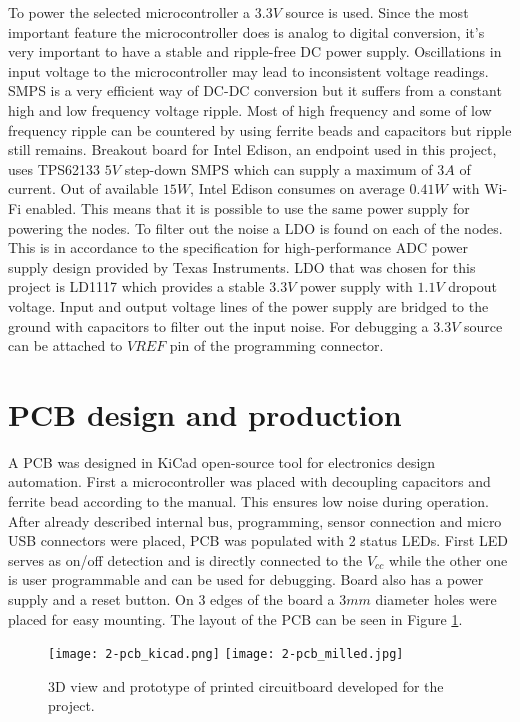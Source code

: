 To power the selected microcontroller a $3.3V$ source is used. Since the most important feature the microcontroller does is analog to digital conversion, it's very important to have a stable and ripple-free \ac{DC} power supply. Oscillations in input voltage to the microcontroller may lead to inconsistent voltage readings. \ac{SMPS} is a very efficient way of \ac{DC}-\ac{DC} conversion but it suffers from a constant high and low frequency voltage ripple. Most of high frequency and some of low frequency ripple can be countered by using ferrite beads and capacitors but ripple still remains. Breakout board for Intel Edison, an endpoint used in this project, uses TPS62133 $5V$ step-down \ac{SMPS} which can supply a maximum of $3A$ of current\cite{edison_breakout}\cite{TPS6213}. Out of available $15W$, Intel Edison consumes on average $0.41W$ with Wi-Fi enabled. This means that it is possible to use the same power supply for powering the nodes. To filter out the noise a \ac{LDO} is found on each of the nodes. This is in accordance to the specification for high-performance \ac{ADC} power supply design provided by Texas Instruments\cite{SMPS}. \ac{LDO} that was chosen for this project is LD1117 which provides a stable $3.3V$ power supply with $1.1V$ dropout voltage. Input and output voltage lines of the power supply are bridged to the ground with capacitors to filter out the input noise. For debugging a $3.3V$ source can be attached to ${VREF}$ pin of the programming connector.


\section{PCB design and production}

A \ac{PCB} was designed in KiCad open-source tool for electronics design automation. First a microcontroller was placed with decoupling capacitors and ferrite bead according to the manual\cite{ATSAMD}. This ensures low noise during operation. After already described internal bus, programming, sensor connection and  micro USB connectors were placed, \ac{PCB} was populated with 2 status \ac{LED}s. First \ac{LED} serves as on/off detection and is directly connected to the $V_{cc}$ while the other one is user programmable and can be used for debugging. Board also has a power supply and a reset button. On 3 edges of the board a $3mm$ diameter holes were placed for easy mounting. The layout of the \ac{PCB} can be seen in Figure \ref{fig:pcb_kicad}.

\begin{figure}[h]
  \begin{center}
    \texttt{[image: 2-pcb\_kicad.png]}
    \hspace{1cm}
    \texttt{[image: 2-pcb\_milled.jpg]}
  \end{center}
  \caption{3D view and prototype of printed circuitboard developed for the project.}
  \label{fig:pcb_kicad}
\end{figure}

